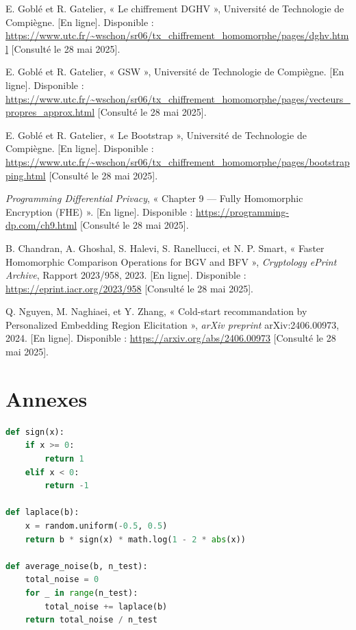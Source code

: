 \documentclass{article}
\begin{document}
\begin{thebibliography}{99}
    E. Goblé et R. Gatelier, « Le chiffrement DGHV », Université de Technologie de Compiègne. [En ligne]. Disponible : \url{https://www.utc.fr/~wschon/sr06/tx_chiffrement_homomorphe/pages/dghv.html} [Consulté le 28 mai 2025].

    E. Goblé et R. Gatelier, « GSW », Université de Technologie de Compiègne. [En ligne]. Disponible : \url{https://www.utc.fr/~wschon/sr06/tx_chiffrement_homomorphe/pages/vecteurs_propres_approx.html} [Consulté le 28 mai 2025].

    E. Goblé et R. Gatelier, « Le Bootstrap », Université de Technologie de Compiègne. [En ligne]. Disponible : \url{https://www.utc.fr/~wschon/sr06/tx_chiffrement_homomorphe/pages/bootstrapping.html} [Consulté le 28 mai 2025].

    \emph{Programming Differential Privacy}, « Chapter 9 — Fully Homomorphic Encryption (FHE) ». [En ligne]. Disponible : \url{https://programming-dp.com/ch9.html} [Consulté le 28 mai 2025].

    B. Chandran, A. Ghoshal, S. Halevi, S. Ranellucci, et N. P. Smart, « Faster Homomorphic Comparison Operations for BGV and BFV », \emph{Cryptology ePrint Archive}, Rapport 2023/958, 2023. [En ligne]. Disponible : \url{https://eprint.iacr.org/2023/958} [Consulté le 28 mai 2025].

    Q. Nguyen, M. Naghiaei, et Y. Zhang, « Cold-start recommandation by Personalized Embedding Region Elicitation », \emph{arXiv preprint} arXiv:2406.00973, 2024. [En ligne]. Disponible : \url{https://arxiv.org/abs/2406.00973} [Consulté le 28 mai 2025].

\end{thebibliography}

\newpage
\section*{Annexes}

\begin{lstlisting}[language=Python, caption={Fonction de génération de bruit Laplacien}, label={lst:laplace}]
def sign(x):
    if x >= 0:
        return 1
    elif x < 0:
        return -1

def laplace(b):
    x = random.uniform(-0.5, 0.5)
    return b * sign(x) * math.log(1 - 2 * abs(x))

def average_noise(b, n_test):
    total_noise = 0
    for _ in range(n_test):
        total_noise += laplace(b)
    return total_noise / n_test 
\end{lstlisting}
\end{document}

